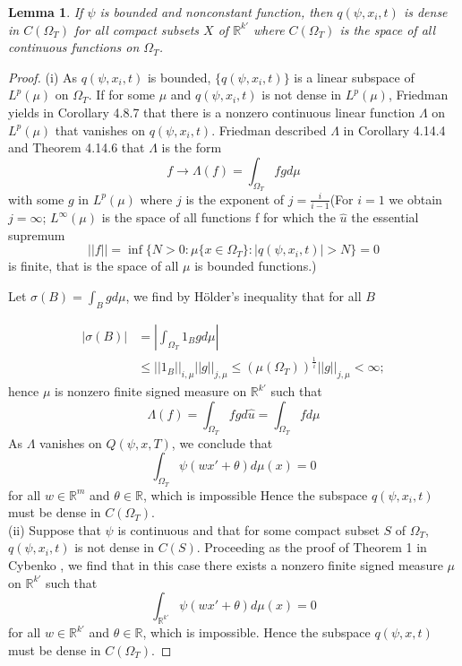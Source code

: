 \documentclass{article}
\newtheorem{lemma}{Lemma}[section]
\begin{document}
\begin{lemma}
	If $\psi$ is bounded and nonconstant function, then $q(\psi,x_i,t)$ is dense in $C(\Omega_{T})$ for all compact subsets $X$ of $\mathbb{R}^{k'}$ where $C(\Omega_{T})$ is the space of all continuous functions on $\Omega_{T}$. \label{dense_set}
\end{lemma}
\begin{proof}
	(i) As $q(\psi,x_i,t)$ is bounded, $\{q(\psi,x_i,t)\}$ is a linear subspace of $L^{p}(\mu)$ on $\Omega_{T}$.
If for some $\mu$ and $q(\psi,x_i,t)$ is not dense in $L^{p}(\mu)$, Friedman yields in Corollary 4.8.7 \cite{friedman} that there is a nonzero continuous linear function $\Lambda$ on $L^{p}(\mu)$ that vanishes on $q(\psi,x_i,t)$. Friedman described $\Lambda$ in Corollary 4.14.4 and Theorem 4.14.6 \cite{friedman} that $\Lambda$ is the form
	\[f \rightarrow \Lambda(f)=\int_{\Omega_{T}}fg d\mu\]
	with some $g$ in $L^{p}(\mu)$ where $j$ is the exponent of $j=\frac{i}{i-1}$(For $i=1$ we obtain $j = \infty$; $L^{\infty}(\mu)$ is the space of all functions f for which the $\hat{u}$ the essential supremum
		\[||f|| =\inf\{N>0 : \mu \{x \in \Omega_{T}\} : |q(\psi,x_i,t)| > N\} = 0 \]
		is finite, that is the space of all $\mu$ is bounded functions.)

		Let $\sigma(B) = \int_{B} g d\mu$, we find by H\"older's inequality that for all $B$

		\begin{equation}
		\begin{aligned}
		\left|\sigma(B)\right| &= \left|\int_{\Omega_{T}}1_{B}g d \mu\right|\\
		 & \leq ||1_{B}||_{i,\mu} ||g||_{j,\mu} \leq (\mu(\Omega_{T}))^{\frac{1}{i}}||g||_{j,\mu} < \infty;
		 \end{aligned}
		\end{equation}
	     hence $\mu$ is nonzero finite signed measure on $\mathbb R^{k'}$ such that
	     \begin{equation}
	     \Lambda(f) =\int_{\Omega_{T}}fg d\hat{u} =  \int_{\Omega_{T}}f d\mu
	     \end{equation}
	     As $\Lambda$ vanishes on $Q(\psi,x,T)$, we conclude that
	     \begin{equation}
	     \int_{\Omega_{T}} \psi(wx'+\theta)d \mu(x) = 0
	    \end{equation}
	    for all $w \in\mathbb{R}^{m}$ and $\theta \in \mathbb{R}$, which is impossible
Hence the subspace $q(\psi,x_i,t)$ must be dense in $C(\Omega_{T})$.\\

	    (ii) Suppose that $\psi$ is continuous and that for some compact subset $S$ of $\Omega_{T}$, $q(\psi,x_i,t)$ is not dense in $C(S)$. Proceeding as the proof of Theorem 1 in Cybenko \cite{cybenko}, we find that in this case there exists a nonzero finite signed measure $\mu$ on $\mathbb R^{k'}$ such that
	    \[ \int_{\mathbb{R}^{k'}} \psi(wx'+\theta)d \mu(x) = 0\]
	    for all $w \in\mathbb{R}^{k'}$ and $\theta \in \mathbb{R}$, which is impossible.
Hence the subspace $q(\psi, x, t)$ must be dense in $C(\Omega_{T})$.
\end{proof}
\end{document}
